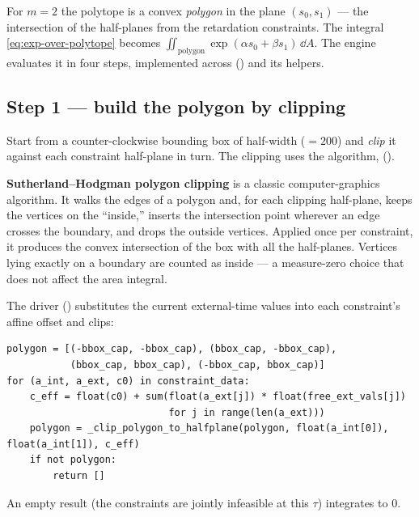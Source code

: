 For $m=2$ the polytope is a convex \emph{polygon} in the plane $(s_0, s_1)$ ---
the intersection of the half-planes from the retardation constraints. The
integral \eqref{eq:exp-over-polytope} becomes $\iint_{\text{polygon}}
\exp(\alpha s_0 + \beta s_1)\,\dd A$. The engine evaluates it in four steps,
implemented across 
() and its helpers.

\subsection{Step 1 --- build the polygon by clipping}

Start from a counter-clockwise bounding box of half-width 
($=200$) and \emph{clip} it against each constraint half-plane in turn. The
clipping uses the  algorithm,
 ().

\begin{defn}
\textbf{Sutherland--Hodgman polygon clipping} is a classic computer-graphics
algorithm. It walks the edges of a polygon and, for each clipping half-plane,
keeps the vertices on the ``inside,'' inserts the intersection point wherever an
edge crosses the boundary, and drops the outside vertices. Applied once per
constraint, it produces the convex intersection of the box with all the
half-planes. Vertices lying exactly on a boundary are counted as inside --- a
measure-zero choice that does not affect the area integral.
\end{defn}

The driver  ()
substitutes the current external-time values into each constraint's affine offset
and clips:

\begin{lstlisting}
polygon = [(-bbox_cap, -bbox_cap), (bbox_cap, -bbox_cap),
           (bbox_cap, bbox_cap), (-bbox_cap, bbox_cap)]
for (a_int, a_ext, c0) in constraint_data:
    c_eff = float(c0) + sum(float(a_ext[j]) * float(free_ext_vals[j])
                            for j in range(len(a_ext)))
    polygon = _clip_polygon_to_halfplane(polygon, float(a_int[0]), float(a_int[1]), c_eff)
    if not polygon:
        return []
\end{lstlisting}

\noindent An empty result (the constraints are jointly infeasible at this
$\tau$) integrates to $0$.

